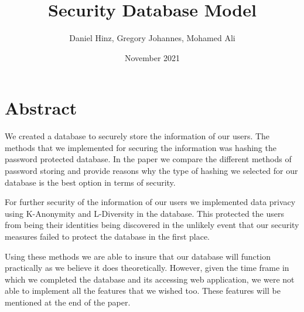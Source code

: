 \documentclass[12pt]{article}
\author{Daniel Hinz, Gregory Johannes, Mohamed Ali}
\date{November 2021}
\begin{document}
\title{Security Database Model}
\maketitle

\section*{\Large Abstract}
We created a database to securely store the information of our users. The methods that we implemented for securing the information was hashing the password protected database. In the paper we compare the different methods of password storing and provide reasons why the type of hashing we selected for our database is the best option in terms of security. ~\newline

For further security of the information of our users we implemented data privacy using K-Anonymity and L-Diversity in the database. This protected the users from being their identities being discovered in the unlikely event that our security measures failed to protect the database in the first place. ~\newline

Using these methods we are able to insure that our database will function practically as we believe it does theoretically. However, given the time frame in which we completed the database and its accessing web application, we were not able to implement all the features that we wished too. These features will be mentioned at the end of the paper. 

\newpage 
\end{document}
